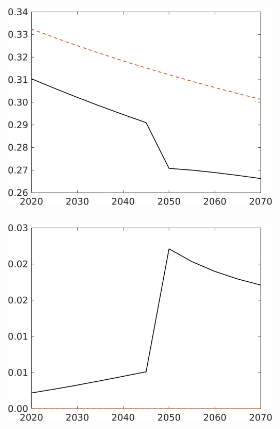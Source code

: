 \begin{figure}[h!!]
\begin{subfigure}{1\textwidth}
\begin{subfigure}[]{0.32\textwidth}
\end{subfigure}	
\begin{subfigure}[]{0.32\textwidth}
	\includegraphics[width=1\textwidth]{../../codding_model/own_basedOnFried/optimalPol_010922_revision/figures/all_13Sept22_Tplus30/sn_LFCompOPT_T_NoTaus_regime4_spillover0_noskill0_sep0_xgrowth0_PV1_etaa0.79_lgd0.png}
\end{subfigure}	
\begin{subfigure}[]{0.32\textwidth}
	\includegraphics[width=1\textwidth]{../../codding_model/own_basedOnFried/optimalPol_010922_revision/figures/all_13Sept22_Tplus30/sg_LFCompOPT_T_NoTaus_regime4_spillover0_noskill0_sep0_xgrowth0_PV1_etaa0.79_lgd0.png}

\end{subfigure}
\end{subfigure}
\end{figure}
